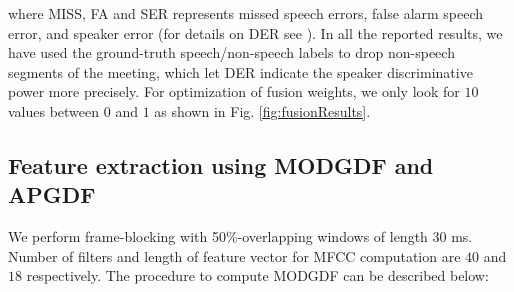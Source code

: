 \documentclass[conference]{IEEEtran}
\begin{document}
where MISS, FA and SER represents  missed speech errors, false alarm speech error, and speaker error (for details on DER see \cite{NIST}). In all the reported results, we have used the ground-truth speech/non-speech labels to drop non-speech segments of the meeting, which let DER indicate the speaker discriminative power more precisely. For optimization of fusion weights, we only look for $10$ values between $0$ and $1$ as shown in Fig. \ref{fig:fusionResults}.


\subsection{Feature extraction using MODGDF and APGDF}

We perform frame-blocking with 50\%-overlapping windows of length 30 ms. Number of filters and length of feature vector for MFCC computation are $40$ and $18$ respectively. The procedure to compute MODGDF can be described below:
\end{document}
